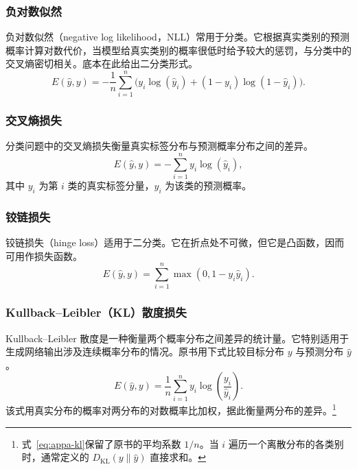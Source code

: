 \subsubsection{负对数似然}
负对数似然（negative log likelihood，NLL）常用于分类。它根据真实类别的预测概率计算对数代价，当模型给真实类别的概率很低时给予较大的惩罚，与分类中的交叉熵密切相关。底本在此给出二分类形式。
\begin{equation}
E(\hat{y},y)=-\frac1n\sum_{i=1}^{n}
\bigl(y_i\log(\hat{y}_i)+(1-y_i)\log(1-\hat{y}_i)\bigr).
\label{eq:appa-nll}
\end{equation}

\subsubsection{交叉熵损失}
分类问题中的交叉熵损失衡量真实标签分布与预测概率分布之间的差异。
\begin{equation}
E(\hat{y},y)=-\sum_{i=1}^{n}y_i\log(\hat{y}_i),
\label{eq:appa-cross-entropy}
\end{equation}
其中 $y_i$ 为第 $i$ 类的真实标签分量，$\hat{y}_i$ 为该类的预测概率。

\subsubsection{铰链损失}
铰链损失（hinge loss）适用于二分类。它在折点处不可微，但它是凸函数，因而可用作损失函数。
\begin{equation}
E(\hat{y},y)=\sum_{i=1}^{n}\max(0,1-y_i\hat{y}_i).
\label{eq:appa-hinge}
\end{equation}

\subsubsection{Kullback–Leibler（KL）散度损失}
Kullback–Leibler 散度是一种衡量两个概率分布之间差异的统计量。它特别适用于生成网络输出涉及连续概率分布的情况。原书用下式比较目标分布 $y$ 与预测分布 $\hat{y}$。
\begin{equation}
E(\hat{y},y)=\frac1n\sum_{i=1}^{n}
y_i\log\!\left(\frac{y_i}{\hat{y}_i}\right).
\label{eq:appa-kl}
\end{equation}
该式用真实分布的概率对两分布的对数概率比加权，据此衡量两分布的差异。\footnote{式~\eqref{eq:appa-kl}保留了原书的平均系数 $1/n$。当 $i$ 遍历一个离散分布的各类别时，通常定义的 $D_{\mathrm{KL}}(y\|\hat{y})$ 直接求和。}

